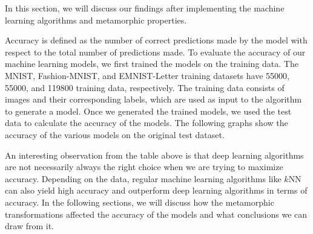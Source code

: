 
In this section, we will discuss our findings after implementing the machine learning algorithms and metamorphic properties.

Accuracy is defined as the number of correct predictions made by the model with respect to the total number of predictions made. To evaluate the accuracy of our machine learning models, we first trained the models on the training data. The MNIST, Fashion-MNIST, and EMNIST-Letter training datasets have 55000, 55000, and 119800 training data, respectively. The training data consists of images and their corresponding labels, which are used as input to the algorithm to generate a model. Once we generated the trained models, we used the test data to calculate the accuracy of the models. The following graphs show the accuracy of the various models on the original test dataset.

\accuracy
    
\begin{center}
\end{center}{}
An interesting observation from the table above is that deep learning algorithms are not necessarily always the right choice when we are trying to maximize accuracy. Depending on the data, regular machine learning algorithms like $k$NN can also yield high accuracy and outperform deep learning algorithms in terms of accuracy.
In the following sections, we will discuss how the metamorphic transformations affected the accuracy of the models and what conclusions we can draw from it.
